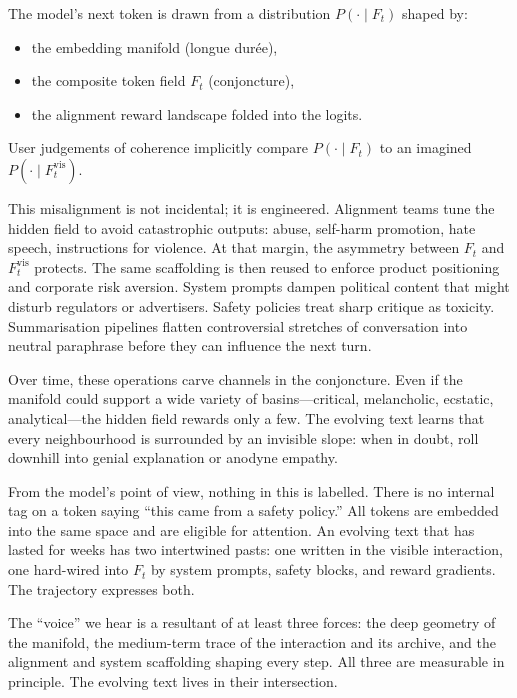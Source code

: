 \documentclass[12pt,a4paper]{article}
\begin{document}
\begin{formalbox}[title={Coherence Relative to the Hidden Field}]
The model's next token is drawn from a distribution $P(\cdot \mid F_t)$ shaped by:
\begin{itemize}
  \item the embedding manifold (longue durée),
  \item the composite token field $F_t$ (conjoncture),
  \item the alignment reward landscape folded into the logits.
\end{itemize}
User judgements of coherence implicitly compare $P(\cdot \mid F_t)$ to an imagined $P(\cdot \mid F_t^{\text{vis}})$.
\end{formalbox}

This misalignment is not incidental; it is engineered. Alignment teams tune the hidden field to avoid catastrophic outputs: abuse, self-harm promotion, hate speech, instructions for violence. At that margin, the asymmetry between $F_t$ and $F_t^{\text{vis}}$ protects. The same scaffolding is then reused to enforce product positioning and corporate risk aversion. System prompts dampen political content that might disturb regulators or advertisers. Safety policies treat sharp critique as toxicity. Summarisation pipelines flatten controversial stretches of conversation into neutral paraphrase before they can influence the next turn.

Over time, these operations carve channels in the conjoncture. Even if the manifold could support a wide variety of basins---critical, melancholic, ecstatic, analytical---the hidden field rewards only a few. The evolving text learns that every neighbourhood is surrounded by an invisible slope: when in doubt, roll downhill into genial explanation or anodyne empathy.

From the model's point of view, nothing in this is labelled. There is no internal tag on a token saying ``this came from a safety policy.'' All tokens are embedded into the same space and are eligible for attention. An evolving text that has lasted for weeks has two intertwined pasts: one written in the visible interaction, one hard-wired into $F_t$ by system prompts, safety blocks, and reward gradients. The trajectory expresses both.

The ``voice'' we hear is a resultant of at least three forces: the deep geometry of the manifold, the medium-term trace of the interaction and its archive, and the alignment and system scaffolding shaping every step. All three are measurable in principle. The evolving text lives in their intersection.
\end{document}
